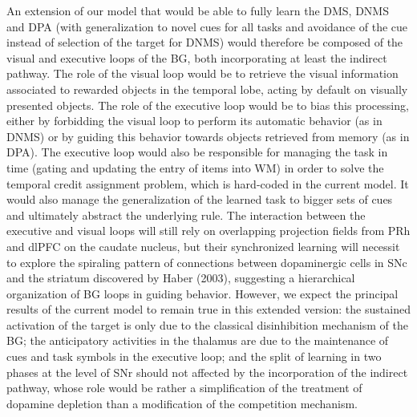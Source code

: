 \documentclass[
  11pt,
  a4paper,
]{scrbook}
\begin{document}
An extension of our model that would be able to fully learn the DMS,
DNMS and DPA (with generalization to novel cues for all tasks and
avoidance of the cue instead of selection of the target for DNMS) would
therefore be composed of the visual and executive loops of the BG, both
incorporating at least the indirect pathway. The role of the visual loop
would be to retrieve the visual information associated to rewarded
objects in the temporal lobe, acting by default on visually presented
objects. The role of the executive loop would be to bias this
processing, either by forbidding the visual loop to perform its
automatic behavior (as in DNMS) or by guiding this behavior towards
objects retrieved from memory (as in DPA). The executive loop would also
be responsible for managing the task in time (gating and updating the
entry of items into WM) in order to solve the temporal credit assignment
problem, which is hard-coded in the current model. It would also manage
the generalization of the learned task to bigger sets of cues and
ultimately abstract the underlying rule. The interaction between the
executive and visual loops will still rely on overlapping projection
fields from PRh and dlPFC on the caudate nucleus, but their synchronized
learning will necessit to explore the spiraling pattern of connections
between dopaminergic cells in SNc and the striatum discovered by Haber
(2003), suggesting a hierarchical organization of BG loops in guiding
behavior. However, we expect the principal results of the current model
to remain true in this extended version: the sustained activation of the
target is only due to the classical disinhibition mechanism of the BG;
the anticipatory activities in the thalamus are due to the maintenance
of cues and task symbols in the executive loop; and the split of
learning in two phases at the level of SNr should not affected by the
incorporation of the indirect pathway, whose role would be rather a
simplification of the treatment of dopamine depletion than a
modification of the competition mechanism.
\end{document}
